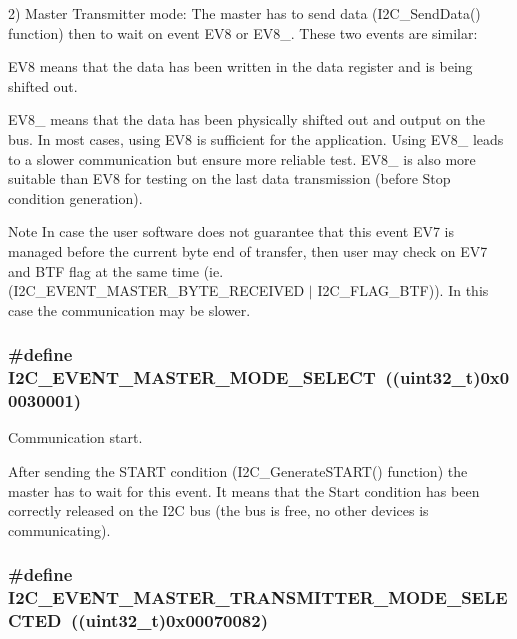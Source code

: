 2) Master Transmitter mode: The master has to send data (I2C\_\-SendData() function) then to wait on event EV8 or EV8\_. These two events are similar:
\begin{DoxyItemize}
\item EV8 means that the data has been written in the data register and is being shifted out.
\item EV8\_ means that the data has been physically shifted out and output on the bus. In most cases, using EV8 is sufficient for the application. Using EV8\_ leads to a slower communication but ensure more reliable test. EV8\_ is also more suitable than EV8 for testing on the last data transmission (before Stop condition generation).
\end{DoxyItemize}

\begin{DoxyNote}{Note}
In case the user software does not guarantee that this event EV7 is managed before the current byte end of transfer, then user may check on EV7 and BTF flag at the same time (ie. (I2C\_\-EVENT\_\-MASTER\_\-BYTE\_\-RECEIVED $|$ I2C\_\-FLAG\_\-BTF)). In this case the communication may be slower. 
\end{DoxyNote}
\hypertarget{group__I2C__Events_gaeef8c22ac035122b06e31b360ac7aeb3}{
\subsubsection[{I2C\_\-EVENT\_\-MASTER\_\-MODE\_\-SELECT}]{\setlength{\rightskip}{0pt plus 5cm}\#define I2C\_\-EVENT\_\-MASTER\_\-MODE\_\-SELECT~((uint32\_\-t)0x00030001)}}
\label{group__I2C__Events_gaeef8c22ac035122b06e31b360ac7aeb3}


Communication start. 

After sending the START condition (I2C\_\-GenerateSTART() function) the master has to wait for this event. It means that the Start condition has been correctly released on the I2C bus (the bus is free, no other devices is communicating). \hypertarget{group__I2C__Events_ga2361a6e60b7dc86fb682dd06fbd3edb7}{
\subsubsection[{I2C\_\-EVENT\_\-MASTER\_\-TRANSMITTER\_\-MODE\_\-SELECTED}]{\setlength{\rightskip}{0pt plus 5cm}\#define I2C\_\-EVENT\_\-MASTER\_\-TRANSMITTER\_\-MODE\_\-SELECTED~((uint32\_\-t)0x00070082)}}
\label{group__I2C__Events_ga2361a6e60b7dc86fb682dd06fbd3edb7}


